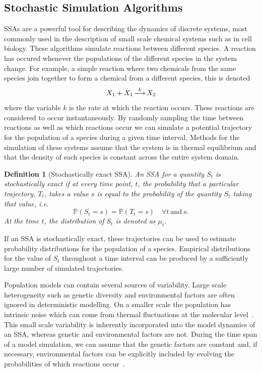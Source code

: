 \documentclass[final]{siamltex}
\newcommand{\into}{\operatornamewithlimits{\longrightarrow}}
\newtheorem{dfn}{Definition}[section]
\begin{document}
\subsection{Stochastic Simulation Algorithms}\label{sec:SSAs}

SSAs are a powerful tool for describing the dynamics of discrete systems, most commonly used in the description of small scale chemical systems such as in cell biology. These algorithms simulate reactions between different species. A reaction has occured whenever the populations of the different species in the system change. For example, a simple reaction where two chemicals from the same species join together to form a chemical from a different species, this is denoted
\begin{equation}\label{eqn:chem_reaction}
	X_1 + X_1 \into^{k} X_2
\end{equation}
where the variable $k$ is the rate at which the reaction occurs. These reactions are considered to occur instantaneously. By randomly sampling the time between reactions as well as which reactions occur we can simulate a potential trajectory for the population of a species during a given time interval. Methods for the simulation of these systems assume that the system is in thermal equilibrium and that the density of each species is constant across the entire system domain.

\begin{dfn}[Stochastically exact SSA]
An SSA for a quantity $S_t$ is stochastically exact if at every time point, $t$, the probability that a particular trajectory, $T_t$, takes a value $s$ is equal to the probability of the quantity $S_t$ taking that value, i.e.
\[
	\mathbb{P}(S_t = s) = \mathbb{P}(T_t = s)\quad \forall t \ \text{and} \ s.
\]
At the time $t$, the distribution of $S_t$ is denoted as $\mu_t$.
\end{dfn}
If an SSA is stochastically exact, these trajectories can be used to estimate probability distributions for the population of a species. Empirical distributions for the value of $S_t$ throughout a time interval can be produced by a sufficiently large number of simulated trajectories.

Population models can contain several sources of variability. Large scale heterogeneity such as genetic diversity and environmental factors are often ignored in deterministic modelling. On a smaller scale the population has intrinsic noise which can come from thermal fluctuations at the molecular level~\cite{szekely2014stochastic,mcadams1999sa}. This small scale variability is inherently incorporated into the model dynamics of an SSA, whereas genetic and environmental factors are not. During the time span of a model simulation, we can assume that the genetic factors are constant and, if necessary, environmental factors can be explicitly included by evolving the probabilities of which reactions occur~\cite{shahrezaei2008colored}.
\end{document}

